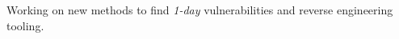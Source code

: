 %
%
%

\begin{center}
    \par{
        Working on new methods to find \emph{1-day} vulnerabilities and reverse engineering tooling.
    }
\end{center}

\vspace{1em}